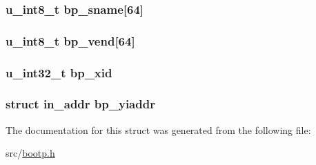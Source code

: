 \subsubsection[{\texorpdfstring{bp\+\_\+sname}{bp_sname}}]{\setlength{\rightskip}{0pt plus 5cm}u\+\_\+int8\+\_\+t bp\+\_\+sname\mbox{[}64\mbox{]}}\hypertarget{structbootp_a52a89eb60f8f6dc046dec6b1481ae49d}{}\label{structbootp_a52a89eb60f8f6dc046dec6b1481ae49d}
\subsubsection[{\texorpdfstring{bp\+\_\+vend}{bp_vend}}]{\setlength{\rightskip}{0pt plus 5cm}u\+\_\+int8\+\_\+t bp\+\_\+vend\mbox{[}64\mbox{]}}\hypertarget{structbootp_a23764ee7fe9112d5e98f91862f3e28b0}{}\label{structbootp_a23764ee7fe9112d5e98f91862f3e28b0}
\subsubsection[{\texorpdfstring{bp\+\_\+xid}{bp_xid}}]{\setlength{\rightskip}{0pt plus 5cm}u\+\_\+int32\+\_\+t bp\+\_\+xid}\hypertarget{structbootp_a918b4094f3f6ea72db8c44c56ef6cb0a}{}\label{structbootp_a918b4094f3f6ea72db8c44c56ef6cb0a}
\subsubsection[{\texorpdfstring{bp\+\_\+yiaddr}{bp_yiaddr}}]{\setlength{\rightskip}{0pt plus 5cm}struct in\+\_\+addr bp\+\_\+yiaddr}\hypertarget{structbootp_a39ada1b8db03fa2f5c7d3c8f60d04cd2}{}\label{structbootp_a39ada1b8db03fa2f5c7d3c8f60d04cd2}


The documentation for this struct was generated from the following file\+:\begin{DoxyCompactItemize}
\item 
src/\hyperlink{bootp_8h}{bootp.\+h}\end{DoxyCompactItemize}
